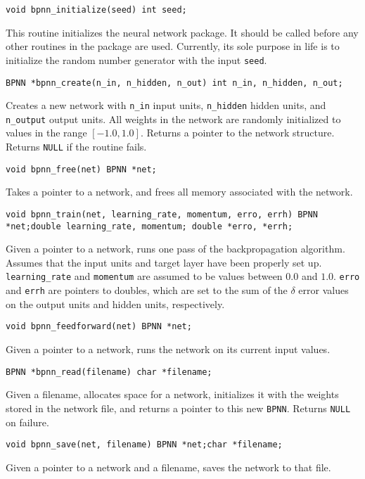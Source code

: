 \begin{description}
\item {\tt void bpnn\_initialize(seed)\newline
int seed;}

This routine initializes the neural network package.  It should be
called before any other routines in the package are used.  Currently,
its sole purpose in life is to initialize the random number generator
with the input {\tt seed}.

\item {\tt BPNN *bpnn\_create(n\_in, n\_hidden, n\_out)\newline
int n\_in, n\_hidden, n\_out;}

Creates a new network with {\tt n\_in} input units, {\tt n\_hidden} hidden
units, and {\tt n\_output} output units.  All weights in the network
are randomly initialized to values in the range $[-1.0, 1.0]$.  Returns
a pointer to the network structure.  Returns {\tt NULL} if the routine
fails.

\item {\tt void bpnn\_free(net)\newline
BPNN *net;}

Takes a pointer to a network, and frees all memory associated with
the network.

\item {\tt void bpnn\_train(net, learning\_rate, momentum, erro, errh)\newline
BPNN *net;\newline double learning\_rate, momentum;\newline
double *erro, *errh;}

Given a pointer to a network, runs one pass of the backpropagation algorithm.
Assumes that the input units and target layer have been properly set up.
{\tt learning\_rate} and {\tt momentum} are assumed to be values between
$0.0$ and $1.0$.  {\tt erro} and {\tt errh} are pointers to doubles, which
are set to the sum of the $\delta$ error values on the output units
and hidden units, respectively.

\item {\tt void bpnn\_feedforward(net)\newline
BPNN *net;}

Given a pointer to a network, runs the network on its current input
values.

\item {\tt BPNN *bpnn\_read(filename)\newline
char *filename;}

Given a filename, allocates space for a network, initializes it with the
weights stored in the network file, and returns a pointer to this new
{\tt BPNN}.  Returns {\tt NULL} on failure.

\item {\tt void bpnn\_save(net, filename)\newline
BPNN *net;\newline char *filename;}

Given a pointer to a network and a filename, saves the network to that
file.

\end{description}

